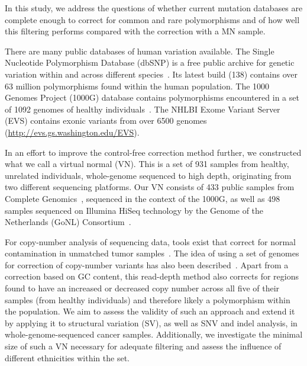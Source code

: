 In this study, we address the questions of whether current mutation databases are complete enough to correct for common and rare polymorphisms and of how well this filtering performs compared with the correction with a MN sample.

There are many public databases of human variation available. The Single Nucleotide Polymorphism Database (dbSNP) is a free public archive for genetic variation within and across different species~\cite{sherry2001dbsnp}. Its latest build (138) contains over 63 million polymorphisms found within the human population. The 1000 Genomes Project (1000G) database contains polymorphisms encountered in a set of 1092 genomes of healthy individuals~\cite{10002010map,10002012integrated}. The NHLBI Exome Variant Server (EVS) contains exonic variants from over 6500 genomes (\url{http://evs.gs.washington.edu/EVS}).

In an effort to improve the control-free correction method further, we constructed what we call a virtual normal (VN). This is a set of 931 samples from healthy, unrelated individuals, whole-genome sequenced to high depth, originating from two different sequencing platforms. Our VN consists of 433 public samples from Complete Genomics~\cite{drmanac2010human}, sequenced in the context of the 1000G, as well as 498 samples sequenced on Illumina HiSeq technology by the Genome of the Netherlands (GoNL) Consortium~\cite{boomsma2014genome,francioli2014whole}.

For copy-number analysis of sequencing data, tools exist that correct for normal contamination in unmatched tumor samples~\cite{boeva2010control}. The idea of using a set of genomes for correction of copy-number variants has also been described~\cite{yoon2009sensitive}. Apart from a correction based on GC content, this read-depth method also corrects for regions found to have an increased or decreased copy number across all five of their samples (from healthy individuals) and therefore likely a polymorphism within the population. We aim to assess the validity of such an approach and extend it by applying it to structural variation (SV), as well as SNV and indel analysis, in whole-genome-sequenced cancer samples. Additionally, we investigate the minimal size of such a VN necessary for adequate filtering and assess the influence of different ethnicities within the set.

